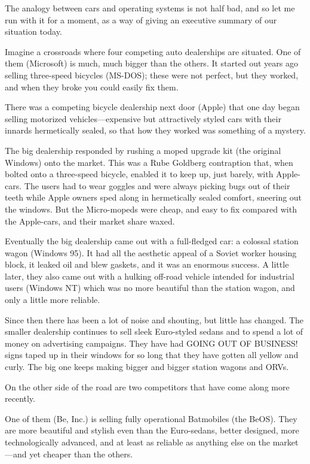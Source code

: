 \documentclass[
  fontsize=11pt,
  paper=landscape,
  twocolumn=true,
  pagesize=pdftex,
  headings=small,
  DIV=15,
  ]{scrartcl}
\begin{document}
The analogy between cars and operating systems is not half bad, and so
let me run with it for a moment, as a way of giving an executive summary
of our situation today.

Imagine a crossroads where four competing auto dealerships are situated.
One of them (Microsoft) is much, much bigger than the others. It started
out years ago selling three-speed bicycles (MS-DOS); these were not
perfect, but they worked, and when they broke you could easily fix them.

There was a competing bicycle dealership next door (Apple) that one day
began selling motorized vehicles---expensive but attractively styled
cars with their innards hermetically sealed, so that how they worked was
something of a mystery.

The big dealership responded by rushing a moped upgrade kit (the
original Windows) onto the market. This was a Rube Goldberg contraption
that, when bolted onto a three-speed bicycle, enabled it to keep up,
just barely, with Apple-cars. The users had to wear goggles and were
always picking bugs out of their teeth while Apple owners sped along in
hermetically sealed comfort, sneering out the windows. But the
Micro-mopeds were cheap, and easy to fix compared with the Apple-cars,
and their market share waxed.

Eventually the big dealership came out with a full-fledged car: a
colossal station wagon (Windows 95). It had all the aesthetic appeal of
a Soviet worker housing block, it leaked oil and blew gaskets, and it
was an enormous success. A little later, they also came out with a
hulking off-road vehicle intended for industrial users (Windows NT)
which was no more beautiful than the station wagon, and only a little
more reliable.

Since then there has been a lot of noise and shouting, but little has
changed. The smaller dealership continues to sell sleek Euro-styled
sedans and to spend a lot of money on advertising campaigns. They have
had GOING OUT OF BUSINESS! signs taped up in their windows for so long
that they have gotten all yellow and curly. The big one keeps making
bigger and bigger station wagons and ORVs.

On the other side of the road are two competitors that have come along
more recently.

One of them (Be, Inc.) is selling fully operational Batmobiles (the
BeOS). They are more beautiful and stylish even than the Euro-sedans,
better designed, more technologically advanced, and at least as reliable
as anything else on the market---and yet cheaper than the others.
\end{document}
